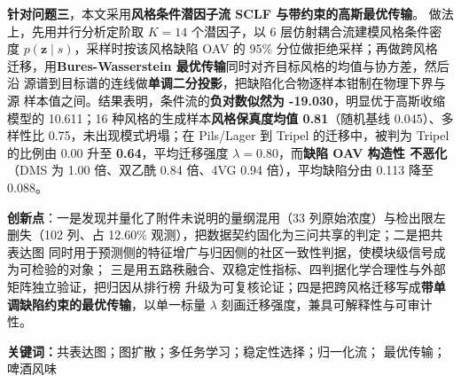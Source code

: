 \textbf{针对问题三}，本文采用\textbf{风格条件潜因子流 SCLF 与带约束的高斯最优传输}。
做法上，先用并行分析定阶取 $K=14$ 个潜因子，以 6 层仿射耦合流建模风格条件密度
$p(\bm{z}\mid s)$，采样时按该风格缺陷 OAV 的 95\% 分位做拒绝采样；再做跨风格
迁移，用\textbf{Bures-Wasserstein 最优传输}同时对齐目标风格的均值与协方差，然后沿
源谱到目标谱的连线做\textbf{单调二分投影}，把缺陷化合物逐样本钳制在物理下界与源
样本值之间。结果表明，条件流的\textbf{负对数似然为 -19.030}，明显优于高斯收缩模型的
10.611；16 种风格的生成样本\textbf{风格保真度均值 0.81}（随机基线 0.045）、多样性比
0.75，未出现模式坍塌；在 Pils/Lager 到 Tripel 的迁移中，被判为 Tripel 的比例由
0.00 升至 \textbf{0.64}，平均迁移强度 $\lambda=0.80$，而\textbf{缺陷 OAV 构造性
不恶化}（DMS 为 1.00 倍、双乙酰 0.84 倍、4VG 0.94 倍），平均缺陷分由 0.113 降至 0.088。

\textbf{创新点}：一是发现并量化了附件未说明的量纲混用（33 列原始浓度）与检出限左
删失（102 列、占 12.60\% 观测），把数据契约固化为三问共享的判定；二是把共表达图
同时用于预测侧的特征增广与归因侧的社区一致性判据，使模块级信号成为可检验的对象；
三是用五路秩融合、双稳定性指标、四判据化学合理性与外部矩阵独立验证，把归因从排行榜
升级为可复核论证；四是把跨风格迁移写成\textbf{带单调缺陷约束的最优传输}，以单一标量
$\lambda$ 刻画迁移强度，兼具可解释性与可审计性。

\vspace{4pt}
\noindent\textbf{关键词：}共表达图；图扩散；多任务学习；稳定性选择；归一化流；
最优传输；啤酒风味
